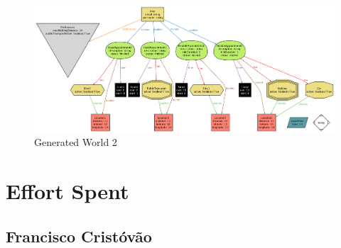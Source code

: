 \documentclass[12pt]{article}
\begin{document}
\begin{figure}[H]
        \includegraphics[scale=0.42, angle=-90, origin=c]{generatedWorld2.png}
        \centering
        \caption{Generated World 2}
    \label{fig:execDetail}
\end{figure}

\section{Effort Spent}
\subsection{Francisco Cristóvão}
\end{document}
